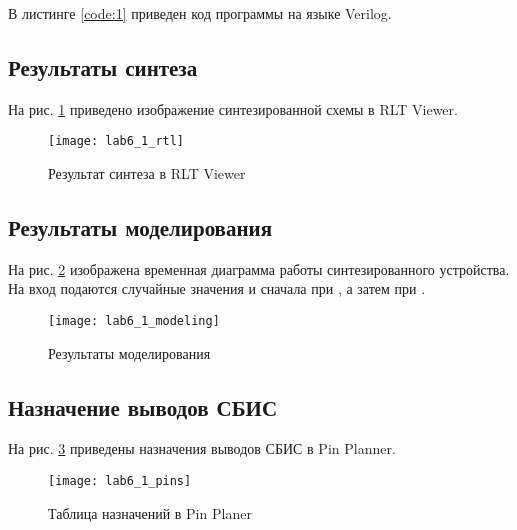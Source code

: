 В листинге \ref{code:1} приведен код программы на языке Verilog.



\newpage

\subsection{Результаты синтеза}

На рис. \ref{fig:lab6_1_rtl} приведено изображение синтезированной схемы в RLT Viewer.

\begin{figure}[H]
\begin{center}
	\texttt{[image: lab6\_1\_rtl]}
	\caption{Результат синтеза в RLT Viewer}
	\label{fig:lab6_1_rtl}
\end{center}
\end{figure}

\subsection{Результаты моделирования}
\label{sec:lab6_1_modeling}

На рис. \ref{fig:lab6_1_modeling} изображена временная диаграмма работы синтезированного устройства. На вход подаются случайные значения  и  сначала при , а затем при .
\vspace{-0.2cm}
\begin{figure}[H]
\begin{center}
	\texttt{[image: lab6\_1\_modeling]}
	\caption{Результаты моделирования}
	\label{fig:lab6_1_modeling}
\end{center}
\end{figure}

\subsection{Назначение выводов СБИС}

На рис. \ref{fig:lab6_1_pins} приведены назначения выводов СБИС в Pin Planner.

\begin{figure}[H]
\begin{center}
	\texttt{[image: lab6\_1\_pins]}
	\caption{Таблица назначений в Pin Planer}
	\label{fig:lab6_1_pins}
\end{center}
\end{figure}

